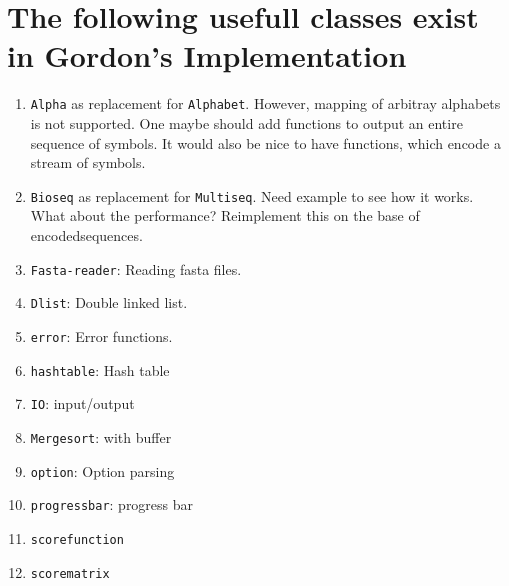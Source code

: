 \documentclass[12pt]{article}
\begin{document}
\section{The following usefull classes exist in Gordon's Implementation}
\begin{enumerate}
\item
\texttt{Alpha} as replacement for \texttt{Alphabet}. However, mapping
of arbitray alphabets is not supported. One maybe should add functions
to output an entire sequence of symbols. It would also be nice to
have functions, which encode a stream of symbols.
\item
\texttt{Bioseq} as replacement for \texttt{Multiseq}. Need example to
see how it works. What about the performance? Reimplement this on the
base of encodedsequences.
\item
\texttt{Fasta-reader}: Reading fasta files.
\item
\texttt{Dlist}: Double linked list.
\item
\texttt{error}: Error functions.
\item
\texttt{hashtable}: Hash table
\item
\texttt{IO}: input/output
\item
\texttt{Mergesort}: with buffer
\item
\texttt{option}: Option parsing
\item
\texttt{progressbar}: progress bar
\item
\texttt{scorefunction}
\item
\texttt{scorematrix}
\end{enumerate}
\end{document}
